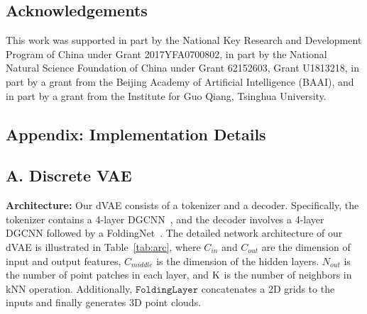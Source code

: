 \subsection*{Acknowledgements}
This work was supported in part by the National Key Research and Development Program of China under Grant 2017YFA0700802, in part by the National Natural Science Foundation of China under Grant 62152603, Grant U1813218, in part by a grant from the Beijing Academy of Artificial Intelligence (BAAI), and in part by a grant from the Institute for Guo Qiang, Tsinghua University.

	{\small
    	\normalem
					}
	

\newpage
\clearpage
\begin{appendix}
\section*{Appendix: Implementation Details}

\subsection*{A. Discrete VAE}
\noindent \textbf{Architecture:}
Our dVAE consists of a tokenizer and a decoder. Specifically, the tokenizer contains a 4-layer DGCNN~\cite{wang2019dynamic}, and the decoder involves a 4-layer DGCNN followed by a FoldingNet~\cite{foldingnet}. The detailed network architecture of our dVAE  is illustrated in Table~\ref{tab:arc}, where $C_{in}$ and $C_{out}$ are the dimension of input and output features, $C_{middle}$ is the dimension of the hidden layers. $N_{out}$ is the number of point patches in each layer, and  $\textup{K}$  is the number of neighbors in kNN operation. Additionally, $\texttt{FoldingLayer}$ concatenates a 2D grids to the inputs and finally generates 3D point clouds. 


\end{appendix}

